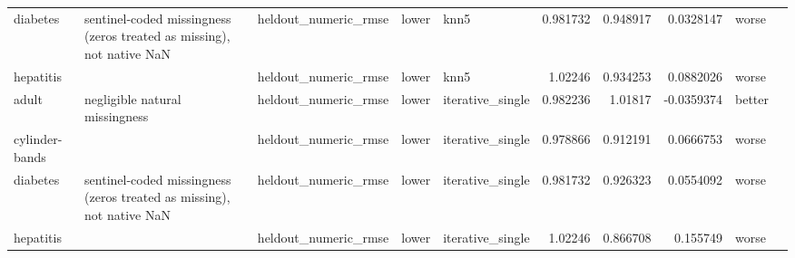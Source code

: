 \begin{table}[ht]
{\begin{tabular}{lllllrrrll}
 diabetes       & sentinel-coded missingness (zeros treated as missing), not native NaN & heldout\_numeric\_rmse           & lower              & knn5             &                   0.981732 &               0.948917 &                     0.0328147   & worse                &                                                                                                                    \\
 hepatitis      &                                                                       & heldout\_numeric\_rmse           & lower              & knn5             &                   1.02246  &               0.934253 &                     0.0882026   & worse                &                                                                                                                    \\
 adult          & negligible natural missingness                                        & heldout\_numeric\_rmse           & lower              & iterative\_single &                   0.982236 &               1.01817  &                    -0.0359374   & better               &                                                                                                                    \\
 cylinder-bands &                                                                       & heldout\_numeric\_rmse           & lower              & iterative\_single &                   0.978866 &               0.912191 &                     0.0666753   & worse                &                                                                                                                    \\
 diabetes       & sentinel-coded missingness (zeros treated as missing), not native NaN & heldout\_numeric\_rmse           & lower              & iterative\_single &                   0.981732 &               0.926323 &                     0.0554092   & worse                &                                                                                                                    \\
 hepatitis      &                                                                       & heldout\_numeric\_rmse           & lower              & iterative\_single &                   1.02246  &               0.866708 &                     0.155749    & worse                &                                                                                                                    \\

\end{tabular}}
\end{table}
